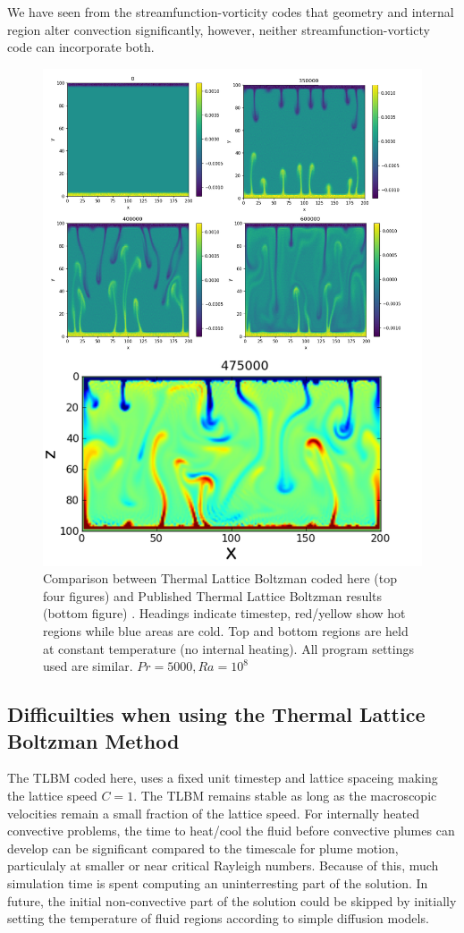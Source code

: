\documentclass{article}
\begin{document}
We have seen from the streamfunction-vorticity codes that geometry and internal region alter convection significantly, however, neither streamfunction-vorticty code can incorporate both. 
\begin{figure}
	\centering
	\includegraphics{latticeboltzmancheck.png}
	\caption{ Comparison between Thermal Lattice Boltzman coded here (top four figures) and Published Thermal Lattice Boltzman results (bottom figure) \cite{mora2017simulation}. Headings indicate timestep, red/yellow show hot regions while blue areas are cold. Top and bottom regions are held at constant temperature (no internal heating). All program settings used are similar. $Pr=5000, Ra=10^8$}
	\label{Lattice Boltzman Check}
\end{figure}

\subsection*{Difficuilties when using the Thermal Lattice Boltzman Method}
The TLBM coded here, uses a fixed unit timestep and lattice spaceing making the lattice speed $C=1$. The TLBM remains stable as long as the macroscopic velocities remain a small fraction of the lattice speed. For internally heated convective problems, the time to heat/cool the fluid before convective plumes can develop can be significant compared to the timescale for plume motion, particulaly at smaller or near critical Rayleigh numbers. Because of this, much simulation time is spent computing an uninterresting part of the solution. In future, the initial non-convective part of the solution could be skipped by initially setting the temperature of fluid regions according to simple diffusion models. 
\end{document}
